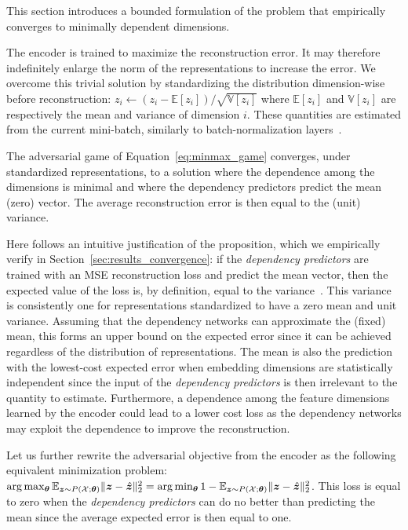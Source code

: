 This section introduces a bounded formulation of the problem that empirically converges to minimally dependent dimensions. %

The encoder is trained to maximize the reconstruction error. It may therefore indefinitely enlarge the norm of the representations to increase the error. 
We overcome this trivial solution by standardizing the distribution dimension-wise before reconstruction: 
$z_i \leftarrow \left(z_i - \mathbb{E}[z_i]\right)/\sqrt{\mathbb{V}[z_i]}
$ where $\mathbb{E}[z_i]$ and $\mathbb{V}[z_i]$ are respectively the mean and variance of dimension $i$. These quantities are estimated from the current mini-batch, similarly to batch-normalization layers~\citep{ioffe2015batchnorm}. 

\begin{proposition} \label{prop:convergence_std_game}
    The adversarial game of Equation~\ref{eq:minmax_game} converges, under standardized representations, to a solution where the dependence among the dimensions is minimal and where the dependency predictors predict the mean (zero) vector. The average reconstruction error is then equal to the (unit) variance.
\end{proposition}
Here follows an intuitive justification of the proposition, which we empirically verify in Section~\ref{sec:results_convergence}:  
if the \textit{dependency predictors} are trained with an MSE reconstruction loss and predict the mean vector, then the expected value of the loss is, by definition, equal to the variance~\citep{baldi1989pca_and_sgd}. 
This variance is consistently one for representations standardized to have a zero mean and unit variance. 
Assuming that the dependency networks can approximate the (fixed) mean, this forms an upper bound on the expected error since it can be achieved regardless of the distribution of representations. 
The mean is also the prediction with the lowest-cost expected error when embedding dimensions are statistically independent since the input of the \textit{dependency predictors} is then irrelevant to the quantity to estimate. Furthermore, a dependence among the feature dimensions learned by the encoder could lead to a lower cost loss as the dependency networks may exploit the dependence to improve the reconstruction. 

Let us further rewrite the adversarial objective from the encoder as the following equivalent minimization problem: $\arg\max_{{\bm{\theta}}} \mathbb{E}_{{\bm{z}}\sim P(\mathcal{X};{\bm{\theta}})} \lVert {\bm{z}} - \hat{{\bm{z}}} \rVert_2^2 = \arg\min_{{\bm{\theta}}} 1 - \mathbb{E}_{{\bm{z}}\sim P(\mathcal{X};{\bm{\theta}})} \lVert {\bm{z}} - \hat{{\bm{z}}} \rVert_2^2$. This loss is equal to zero when the \textit{dependency predictors} can do no better than predicting the mean since the average expected error is then equal to one. 

